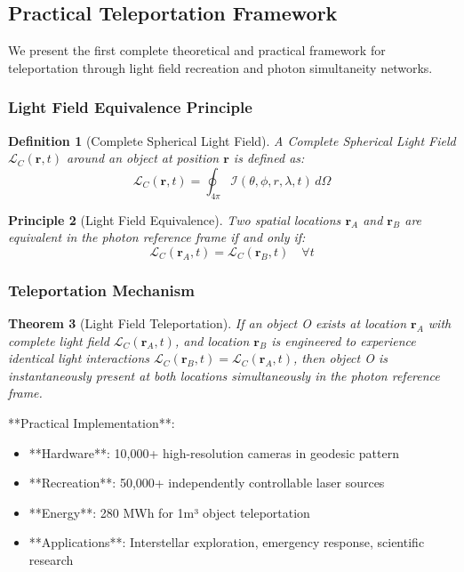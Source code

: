 \documentclass[12pt,a4paper]{article}
\newtheorem{theorem}{Theorem}[section]
\newtheorem{definition}[theorem]{Definition}
\newtheorem{principle}[theorem]{Principle}
\theoremstyle{remark}
\begin{document}
\subsection{Practical Teleportation Framework}

We present the first complete theoretical and practical framework for teleportation through light field recreation and photon simultaneity networks.

\subsubsection{Light Field Equivalence Principle}

\begin{definition}[Complete Spherical Light Field]
A Complete Spherical Light Field $\mathcal{L}_C(\mathbf{r}, t)$ around an object at position $\mathbf{r}$ is defined as:
$$\mathcal{L}_C(\mathbf{r}, t) = \oint_{4\pi} \mathcal{I}(\theta, \phi, r, \lambda, t) \, d\Omega$$
\end{definition}

\begin{principle}[Light Field Equivalence]
Two spatial locations $\mathbf{r}_A$ and $\mathbf{r}_B$ are equivalent in the photon reference frame if and only if:
$$\mathcal{L}_C(\mathbf{r}_A, t) = \mathcal{L}_C(\mathbf{r}_B, t) \quad \forall t$$
\end{principle}

\subsubsection{Teleportation Mechanism}

\begin{theorem}[Light Field Teleportation]
If an object O exists at location $\mathbf{r}_A$ with complete light field $\mathcal{L}_C(\mathbf{r}_A, t)$, and location $\mathbf{r}_B$ is engineered to experience identical light interactions $\mathcal{L}_C(\mathbf{r}_B, t) = \mathcal{L}_C(\mathbf{r}_A, t)$, then object O is instantaneously present at both locations simultaneously in the photon reference frame.
\end{theorem}

**Practical Implementation**:
\begin{itemize}
\item **Hardware**: 10,000+ high-resolution cameras in geodesic pattern
\item **Recreation**: 50,000+ independently controllable laser sources
\item **Energy**: 280 MWh for 1m³ object teleportation
\item **Applications**: Interstellar exploration, emergency response, scientific research
\end{itemize}
\end{document}
